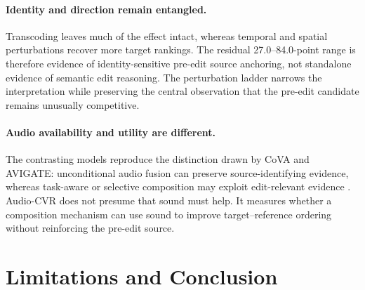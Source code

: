 \documentclass[letterpaper]{article}
\begin{document}
\paragraph{Identity and direction remain entangled.}
Transcoding leaves much of the effect intact, whereas temporal and spatial perturbations recover more target rankings.
The residual 27.0--84.0-point range is therefore evidence of identity-sensitive pre-edit source anchoring, not standalone evidence of semantic edit reasoning.
The perturbation ladder narrows the interpretation while preserving the central observation that the pre-edit candidate remains unusually competitive.

\paragraph{Audio availability and utility are different.}
The contrasting models reproduce the distinction drawn by CoVA and AVIGATE: unconditional audio fusion can preserve source-identifying evidence, whereas task-aware or selective composition may exploit edit-relevant evidence \cite{han2026cova,jeong2025avigate}.
Audio-CVR does not presume that sound must help.
It measures whether a composition mechanism can use sound to improve target--reference ordering without reinforcing the pre-edit source.

\section{Limitations and Conclusion}
\end{document}
